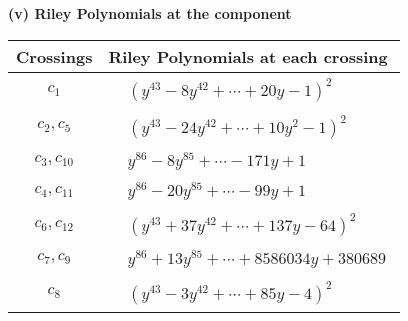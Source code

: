 \documentclass[1p]{elsarticle_modified}
\theoremstyle{definition}
\begin{document}
\flushleft \textbf{(v) Riley Polynomials at the component}\newline \\
\begin{tabular}{m{50pt}|m{274pt}}
Crossings & \hspace{64pt}Riley Polynomials at each crossing \\
\hline $$\begin{aligned}c_{1}\end{aligned}$$&$\begin{aligned}
&(y^{43}-8 y^{42}+\cdots+20 y-1)^{2}
\end{aligned}$\\
\hline $$\begin{aligned}c_{2},c_{5}\end{aligned}$$&$\begin{aligned}
&(y^{43}-24 y^{42}+\cdots+10 y^2-1)^{2}
\end{aligned}$\\
\hline $$\begin{aligned}c_{3},c_{10}\end{aligned}$$&$\begin{aligned}
&y^{86}-8 y^{85}+\cdots-171 y+1
\end{aligned}$\\
\hline $$\begin{aligned}c_{4},c_{11}\end{aligned}$$&$\begin{aligned}
&y^{86}-20 y^{85}+\cdots-99 y+1
\end{aligned}$\\
\hline $$\begin{aligned}c_{6},c_{12}\end{aligned}$$&$\begin{aligned}
&(y^{43}+37 y^{42}+\cdots+137 y-64)^{2}
\end{aligned}$\\
\hline $$\begin{aligned}c_{7},c_{9}\end{aligned}$$&$\begin{aligned}
&y^{86}+13 y^{85}+\cdots+8586034 y+380689
\end{aligned}$\\
\hline $$\begin{aligned}c_{8}\end{aligned}$$&$\begin{aligned}
&(y^{43}-3 y^{42}+\cdots+85 y-4)^{2}
\end{aligned}$\\
\hline
\end{tabular}\\~\\
\end{document}
